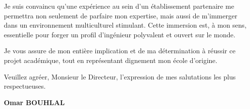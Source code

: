 \documentclass[11pt,a4paper]{article}
\begin{document}
Je suis convaincu qu'une expérience au sein d'un établissement partenaire me permettra non seulement de parfaire mon expertise, mais aussi de m'immerger dans un environnement multiculturel stimulant. Cette immersion est, à mon sens, essentielle pour forger un profil d'ingénieur polyvalent et ouvert sur le monde.

Je vous assure de mon entière implication et de ma détermination à réussir ce projet académique, tout en représentant dignement mon école d'origine.

Veuillez agréer, Monsieur le Directeur, l'expression de mes salutations les plus respectueuses.

\vspace{4em}

\hfill {\bfseries Omar BOUHLAL}
\end{document}
